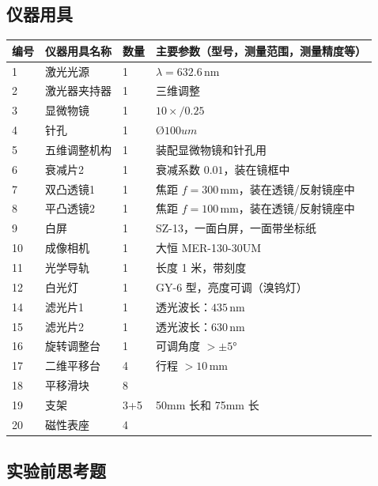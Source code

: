 \documentclass[dvipsnames, svgnames,a4paper,11pt]{article}
\begin{document}
\subsection{仪器用具}
\begin{table}[H]
	\centering
	\renewcommand\arraystretch{1.6}
	\begin{tabular}{p{}|p{}|p{}|p{}}
	\hline
	编号 & 仪器用具名称 & 数量 & 主要参数（型号，测量范围，测量精度等） \\
	\hline
	1  & 激光光源         & 1 & $\lambda = 632.6\,\text{nm}$ \\
	2  & 激光器夹持器     & 1 & 三维调整 \\
	3  & 显微物镜         & 1 & $10\times/0.25$ \\
	4  & 针孔             & 1 & $Ø100um $ \\
	5  & 五维调整机构     & 1 & 装配显微物镜和针孔用 \\
	
	6  & 衰减片2          & 1 & 衰减系数 $0.01$，装在镜框中 \\
	7  & 双凸透镜1        & 1 & 焦距 $f = 300\,\text{mm}$，装在透镜/反射镜座中 \\
	8  & 平凸透镜2        & 1 & 焦距 $f = 100\,\text{mm}$，装在透镜/反射镜座中 \\
	9  & 白屏             & 1 & SZ-13，一面白屏，一面带坐标纸 \\
	10 & 成像相机         & 1 & 大恒 MER-130-30UM  \\
	11 & 光学导轨         & 1 & 长度 1 米，带刻度 \\
	12 & 白光灯           & 1 & GY-6 型，亮度可调（溴钨灯） \\
	14 & 滤光片1          & 1 & 透光波长：$435\,\text{nm}$ \\
	15 & 滤光片2          & 1 & 透光波长：$630\,\text{nm}$ \\
	16 & 旋转调整台       & 1 & 可调角度 $> \pm 5°$ \\
	17 & 二维平移台       & 4 & 行程 $> 10\,\text{mm}$ \\
	18 & 平移滑块       & 8 & \\
	19 & 支架             & 3+5 & 50mm 长和 75mm 长\\
	20 &磁性表座 & 4 & \\
	\hline
\end{tabular}
\end{table}



\subsection{实验前思考题}
\end{document}
